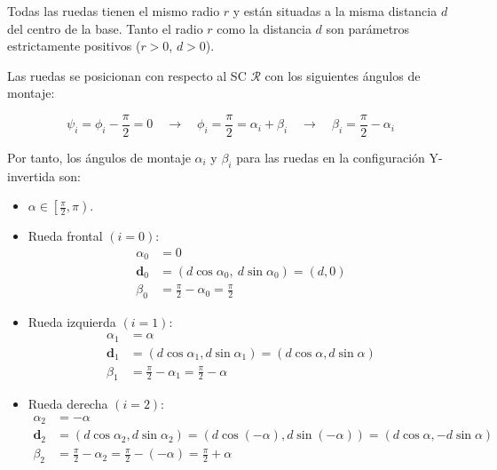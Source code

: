 \documentclass[11pt,a4paper]{article}
\newcommand{\vect}[1]{\bm{#1}}       %
\newcommand{\frameR}{\mathcal{R}}
\begin{document}
Todas las ruedas tienen el mismo radio \(r\) y están situadas a la misma distancia \(d\) del centro de la base. Tanto el radio \(r\) como la distancia \(d\) son parámetros estrictamente positivos (\(r > 0\), \(d > 0\)).

Las ruedas se posicionan con respecto al SC \(\frameR\) con los siguientes ángulos de montaje:

\[
    \psi_i = \phi_i - \frac{\pi}{2} = 0 \quad \rightarrow \quad \phi_i = \frac{\pi}{2} = \alpha_i + \beta_i \quad \rightarrow \quad \beta_i = \frac{\pi}{2} - \alpha_i
\]

Por tanto, los ángulos de montaje \(\alpha_i\) y \(\beta_i\) para las ruedas en la configuración Y-invertida son:

\begin{itemize}
    \item \(\alpha \in \left[\frac{\pi}{2}, \pi\right)\).
    \item Rueda frontal \((i = 0)\):
          \[
              \begin{aligned}
                  \alpha_0   & = 0                                        \\
                  \vect{d}_0 & = (d\cos\alpha_0,\ d\sin\alpha_0) = (d, 0) \\
                  \beta_0    & =\frac{\pi}{2} - \alpha_0 = \frac{\pi}{2}
              \end{aligned}
          \]
    \item Rueda izquierda \((i = 1)\):
          \[
              \begin{aligned}
                  \alpha_1   & = \alpha                                                      \\
                  \vect{d}_1 & = (d\cos\alpha_1, d\sin\alpha_1) = (d\cos\alpha, d\sin\alpha) \\
                  \beta_1    & = \frac{\pi}{2} - \alpha_1 = \frac{\pi}{2} - \alpha
              \end{aligned}
          \]
    \item Rueda derecha \((i = 2)\):
          \[
              \begin{aligned}
                  \alpha_2   & = -\alpha                                                                                         \\
                  \vect{d}_2 & = (d\cos\alpha_2, d\sin\alpha_2) = (d\cos(-\alpha), d\sin(-\alpha)) = (d\cos\alpha, -d\sin\alpha) \\
                  \beta_2    & = \frac{\pi}{2} - \alpha_2 = \frac{\pi}{2} - (-\alpha) = \frac{\pi}{2} + \alpha
              \end{aligned}
          \]
\end{itemize}
\end{document}
